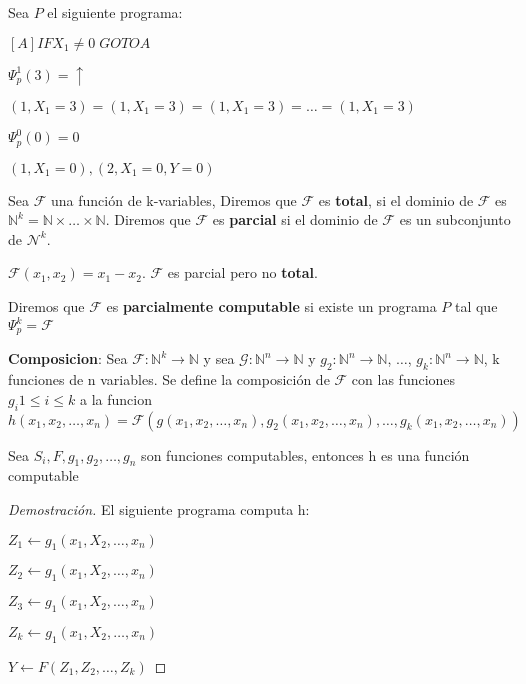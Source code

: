 \begin{example}
Sea $P$ el siguiente programa:
 
$[A] IF X_1 \neq 0 \; GOTO A$
 
$\varPsi_{p}^{1}(3) = \uparrow$
 
$(1, X_1 = 3) = (1, X_1 = 3) = (1, X_1 = 3) = \ldots = (1, X_1 = 3)$
 
$\varPsi_{p}^{0}(0) = 0$
 
$(1, X_1 = 0), (2, X_1 = 0, Y = 0)$
\end{example}
 
\begin{definition}
Sea $\mathcal{F}$ una funci\'on de k-variables, Diremos que $\mathcal{F}$ es \textbf{total}, si el dominio de $\mathcal{F}$ es $\mathbb{N}^{k} = \mathbb{N} \times \ldots \times \mathbb{N}$. Diremos que $\mathcal{F}$ es \textbf{parcial} si el dominio de $\mathcal{F}$ es un subconjunto de $\mathcal{N}^{k}$.
\end{definition}
 
\begin{example}
$\mathcal{F}(x_1, x_2) = x_1 - x_2$. $\mathcal{F}$ es parcial pero no \textbf{total}.
\end{example}
 
\begin{definition}
Diremos que $\mathcal{F}$ es \textbf{parcialmente computable} si existe un programa $P$ tal que $\varPsi_{p}^{k} = \mathcal{F}$
\end{definition}
 
\begin{definition}
\textbf{Composicion}: Sea $\mathcal{F} : \mathbb{N}^{k} \rightarrow \mathbb{N}$ y sea $\mathcal{G}: \mathbb{N}^{n} \rightarrow \mathbb{N}$ y $g_2 \colon \mathbb{N}^{n} \rightarrow \mathbb{N}$, $\ldots$, $g_k \colon \mathbb{N}^{n} \rightarrow \mathbb{N}$, k funciones de n variables. Se define la composici\'on de $\mathcal{F}$ con las funciones $g_i 1 \leq i \leq k$ a la funcion $h(x_1, x_2, \ldots, x_n) = \mathcal{F}(g(x_1, x_2, \ldots, x_n), g_2(x_1, x_2, \ldots, x_n), \ldots, g_k(x_1, x_2, \ldots, x_n))$
\end{definition}
 
\begin{theorem}
Sea $S_i, F, g_1, g_2, \ldots, g_n$ son funciones computables, entonces h es una funci\'on computable
\end{theorem}
 
\begin{proof}[Demostraci\'on]
El siguiente programa computa h:
 
$Z_1 \leftarrow g_1(x_1, X_2, \ldots, x_n)$
 
$Z_2 \leftarrow g_1(x_1, X_2, \ldots, x_n)$
 
$Z_3 \leftarrow g_1(x_1, X_2, \ldots, x_n)$
 
$Z_k \leftarrow g_1(x_1, X_2, \ldots, x_n)$
 
$Y \leftarrow F(Z_1, Z_2, \ldots, Z_k)$
\end{proof}
 
